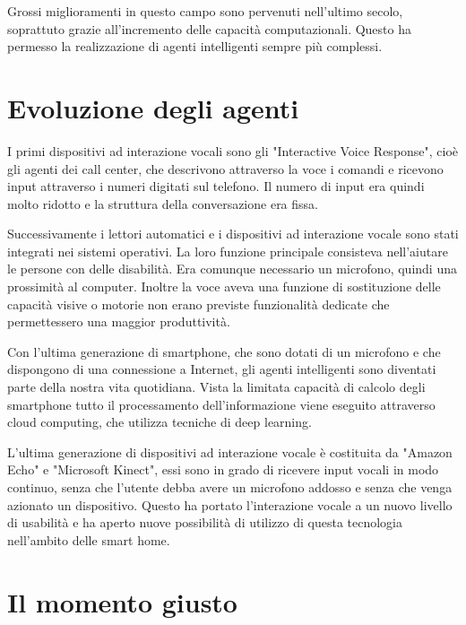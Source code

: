 \documentclass[twoside]{supsistudent}
\begin{document}
Grossi miglioramenti in questo campo sono pervenuti nell'ultimo secolo, soprattuto grazie all'incremento delle capacità computazionali. Questo ha permesso la realizzazione di agenti intelligenti sempre più complessi.

\section{Evoluzione degli agenti}

I primi dispositivi ad interazione vocali sono gli "Interactive Voice Response", cioè gli agenti dei call center, che descrivono attraverso la voce i comandi e ricevono input attraverso i numeri digitati sul telefono. Il numero di input era quindi molto ridotto e la struttura della conversazione era fissa.

Successivamente i lettori automatici e i dispositivi ad interazione vocale sono stati integrati nei sistemi operativi. La loro funzione principale consisteva nell'aiutare le persone con delle disabilità. Era comunque necessario un microfono, quindi una prossimità al computer. Inoltre la voce aveva una funzione di sostituzione delle capacità visive o motorie non erano previste funzionalità dedicate che permettessero una maggior produttività.

Con l'ultima generazione di smartphone, che sono dotati di un microfono e che dispongono di una connessione a Internet, gli agenti intelligenti sono diventati parte della nostra vita quotidiana. Vista la limitata capacità di calcolo degli smartphone tutto il processamento dell'informazione viene eseguito attraverso cloud computing, che utilizza tecniche di deep learning.

L'ultima generazione di dispositivi ad interazione vocale è costituita da "Amazon Echo" e "Microsoft Kinect", essi sono in grado di ricevere input vocali in modo continuo, senza che l'utente debba avere un microfono addosso e senza che venga azionato un dispositivo. Questo ha portato l'interazione vocale  a un nuovo livello di usabilità e ha aperto nuove possibilità di utilizzo di questa tecnologia nell'ambito delle smart home.

\section{Il momento giusto}
\end{document}
